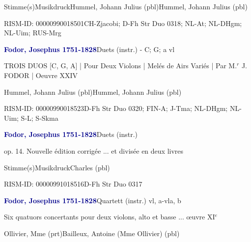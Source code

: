 \documentclass[twocolumn, 12pt]{book}
\begin{document}
\par \textcolor{darkblue}{}  Stimme(s)\newline Musikdruck\newline Hummel, Johann Julius  (pbl)\newline Hummel, Johann Julius  (pbl)
\par RISM-ID: 00000990018501\newline CH-Zjacobi; D-Fh  Str Duo 0318; NL-At; NL-DHgm; NL-Uim; RUS-Mrg
\par \vspace{16pt} \textcolor{darkblue}{\textbf{Fodor, Josephus  1751-1828}}\hfillplus{\textbf{[272]}}\newline Duets (instr.) - C; G; a vl
\par \begin{itshape}TROIS DUOS [C, G, A] | Pour Deux Violons | Melés de Airs Variés | Par  M.$^r$ J. FODOR | Oeuvre XXIV\end{itshape} \newline Hummel, Johann Julius  (pbl)\newline Hummel, Johann Julius  (pbl)
\par RISM-ID: 00000990018523\newline D-Fh  Str Duo 0320; FIN-A; J-Tma; NL-DHgm; NL-Uim; S-L; S-Skma
\par \vspace{16pt} \textcolor{darkblue}{\textbf{Fodor, Josephus  1751-1828}}\hfillplus{\textbf{[273]}}\newline Duets (instr.)
\par \begin{itshape}op. 14. Nouvelle édition corrigée ... et divisée en deux livres\end{itshape} 
\par \textcolor{darkblue}{}  Stimme(s)\newline Musikdruck\newline Charles  (pbl)
\par RISM-ID: 00000991018516\newline D-Fh  Str Duo 0317
\par \vspace{16pt} \textcolor{darkblue}{\textbf{Fodor, Josephus  1751-1828}}\hfillplus{\textbf{[274]}}\newline Quartett (instr.) vl, a-vla, b
\par \begin{itshape}Six quatuors concertants pour deux violons, alto et basse ... œuvre XI$^e$\end{itshape} \newline Ollivier, Mme  (prt)\newline Bailleux, Antoine (Mme Ollivier)  (pbl)
\end{document}
